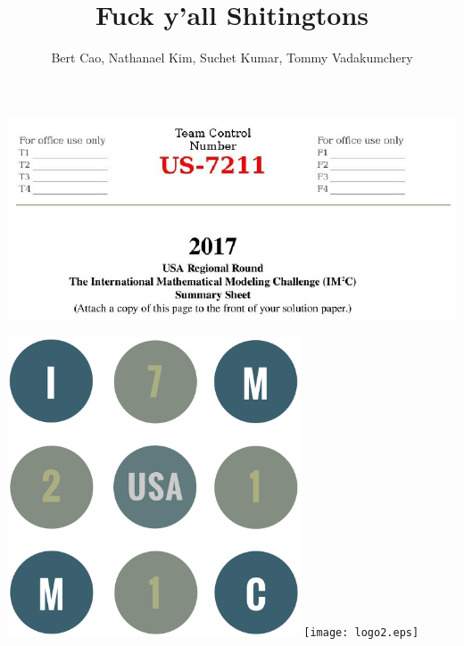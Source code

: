 \documentclass[letterpaper]{article}
\title{Fuck y'all Shitingtons}
\author{Bert Cao, Nathanael Kim, Suchet Kumar, Tommy Vadakumchery}
\begin{document}
	\begin{center}
		\centerline{\includegraphics[width=1.25\textwidth]{summary.eps}}
	\end{center}
		
	\newpage
	\begin{center}
		\includegraphics[width=0.65\textwidth]{love.eps}
		\texttt{[image: logo2.eps]}
	\end{center}


	\newpage
	\tableofcontents
	\newpage

	
	
	
	
	
	
\end{document}
